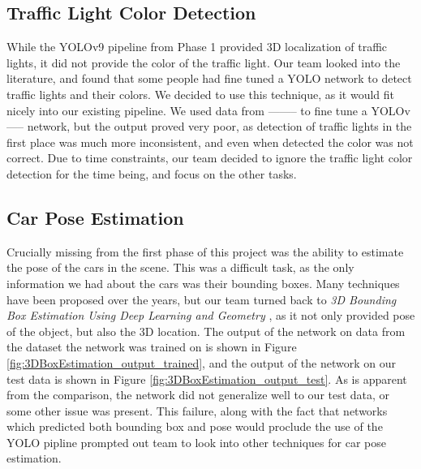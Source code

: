 \subsection{Traffic Light Color Detection}
While the YOLOv9 pipeline from Phase 1 provided 3D localization of traffic lights, it did not provide the color of the traffic light. Our team looked into the literature, and found that some people had fine tuned a YOLO network to detect traffic lights and their colors. We decided to use this technique, as it would fit nicely into our existing pipeline. We used data from -------- to fine tune a YOLOv----- network, but the output proved very poor, as detection of traffic lights in the first place was much more inconsistent, and even when detected the color was not correct. Due to time constraints, our team decided to ignore the traffic light color detection for the time being, and focus on the other tasks.

\subsection{Car Pose Estimation}
Crucially missing from the first phase of this project was the ability to estimate the pose of the cars in the scene. This was a difficult task, as the only information we had about the cars was their bounding boxes. Many techniques have been proposed over the years, but our team turned back to \emph{3D Bounding Box Estimation Using Deep Learning and Geometry} \cite{3DBoxEstimation}, as it not only provided pose of the object, but also the 3D location. The output of the network on data from the dataset the network was trained on is shown in Figure \ref{fig:3DBoxEstimation_output_trained}, and the output of the network on our test data is shown in Figure \ref{fig:3DBoxEstimation_output_test}. As is apparent from the comparison, the network did not generalize well to our test data, or some other issue was present. This failure, along with the fact that networks which predicted both bounding box and pose would proclude the use of the YOLO pipline prompted out team to look into other techniques for car pose estimation.


